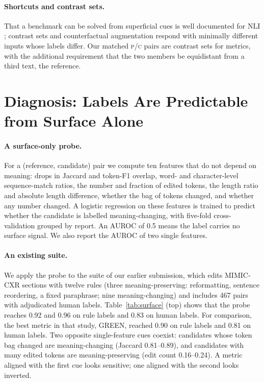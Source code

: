 \documentclass[11pt]{article}
\newcommand{\Pc}{\textsc{p}\xspace}
\newcommand{\Cc}{\textsc{c}\xspace}
\begin{document}
\paragraph{Shortcuts and contrast sets.}
That a benchmark can be solved from superficial cues is well documented for NLI \citep{gururangan-etal-2018-annotation,mccoy-etal-2019-right}; contrast sets \citep{gardner-etal-2020-evaluating} and counterfactual augmentation \citep{kaushik-etal-2020-learning} respond with minimally different inputs whose labels differ. Our matched \Pc/\Cc pairs are contrast sets for metrics, with the additional requirement that the two members be equidistant from a third text, the reference.

\section{Diagnosis: Labels Are Predictable from Surface Alone}
\label{sec:diagnosis}

\paragraph{A surface-only probe.}
For a (reference, candidate) pair we compute ten features that do not depend on meaning: drops in Jaccard and token-F1 overlap, word- and character-level sequence-match ratios, the number and fraction of edited tokens, the length ratio and absolute length difference, whether the bag of tokens changed, and whether any number changed. A logistic regression on these features is trained to predict whether the candidate is labelled meaning-changing, with five-fold cross-validation grouped by report. An AUROC of 0.5 means the label carries no surface signal. We also report the AUROC of two single features.

\paragraph{An existing suite.}
We apply the probe to the suite of our earlier submission, which edits MIMIC-CXR sections with twelve rules (three meaning-preserving: reformatting, sentence reordering, a fixed paraphrase; nine meaning-changing) and includes 467 pairs with adjudicated human labels.
Table~\ref{tab:surface} (top) shows that the probe reaches 0.92 and 0.96 on rule labels and 0.83 on human labels.
For comparison, the best metric in that study, GREEN, reached 0.90 on rule labels and 0.81 on human labels.
Two opposite single-feature cues coexist: candidates whose token bag changed are meaning-changing (Jaccard 0.81--0.89), and candidates with many edited tokens are meaning-preserving (edit count 0.16--0.24).
A metric aligned with the first cue looks sensitive; one aligned with the second looks inverted.
\end{document}
